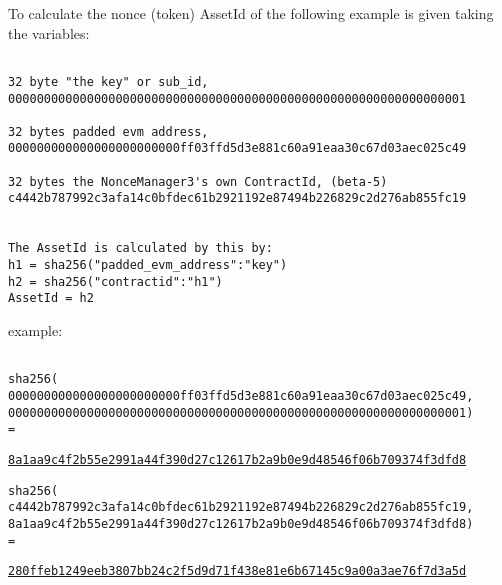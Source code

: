 To calculate the nonce (token) AssetId of the following example is given taking the variables:


\begin{small}
    \begin{verbatim}

32 byte "the key" or sub_id,
0000000000000000000000000000000000000000000000000000000000000001

32 bytes padded evm address,
000000000000000000000000ff03ffd5d3e881c60a91eaa30c67d03aec025c49

32 bytes the NonceManager3's own ContractId, (beta-5)
c4442b787992c3afa14c0bfdec61b2921192e87494b226829c2d276ab855fc19


The AssetId is calculated by this by:
h1 = sha256("padded_evm_address":"key")
h2 = sha256("contractid":"h1")
AssetId = h2
\end{verbatim}
\end{small}


example:

\begin{small}
\begin{verbatim}

sha256(
000000000000000000000000ff03ffd5d3e881c60a91eaa30c67d03aec025c49,
0000000000000000000000000000000000000000000000000000000000000001)
=
\end{verbatim}
\end{small}

\begin{small}
\href{https://emn178.github.io/online-tools/sha256.html?input_type=hex&input=000000000000000000000000ff03ffd5d3e881c60a91eaa30c67d03aec025c490000000000000000000000000000000000000000000000000000000000000001&hmac_input_type=utf-8}{\texttt{8a1aa9c4f2b55e2991a44f390d27c12617b2a9b0e9d48546f06b709374f3dfd8}}\\
\end{small}

\begin{small}
    \begin{verbatim}
sha256(
c4442b787992c3afa14c0bfdec61b2921192e87494b226829c2d276ab855fc19,
8a1aa9c4f2b55e2991a44f390d27c12617b2a9b0e9d48546f06b709374f3dfd8)
=
\end{verbatim}
\end{small}

\begin{small}
\href{https://emn178.github.io/online-tools/sha256.html?input_type=hex&input=c4442b787992c3afa14c0bfdec61b2921192e87494b226829c2d276ab855fc198a1aa9c4f2b55e2991a44f390d27c12617b2a9b0e9d48546f06b709374f3dfd8&hmac_input_type=utf-8}{\texttt{280ffeb1249eeb3807bb24c2f5d9d71f438e81e6b67145c9a00a3ae76f7d3a5d}}\\
\end{small}

